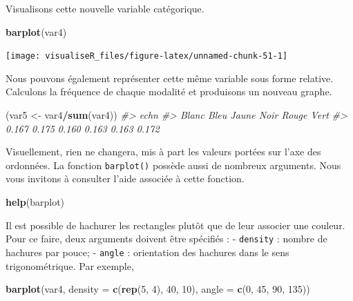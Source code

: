 \documentclass[]{article}
\newenvironment{Shaded}{\begin{snugshade}}{\end{snugshade}}
\newcommand{\CommentTok}[1]{\textcolor[rgb]{0.56,0.35,0.01}{\textit{#1}}}
\newcommand{\DataTypeTok}[1]{\textcolor[rgb]{0.13,0.29,0.53}{#1}}
\newcommand{\DecValTok}[1]{\textcolor[rgb]{0.00,0.00,0.81}{#1}}
\newcommand{\KeywordTok}[1]{\textcolor[rgb]{0.13,0.29,0.53}{\textbf{#1}}}
\newcommand{\NormalTok}[1]{#1}
\newcommand{\OperatorTok}[1]{\textcolor[rgb]{0.81,0.36,0.00}{\textbf{#1}}}
\newcommand{\StringTok}[1]{\textcolor[rgb]{0.31,0.60,0.02}{#1}}
\begin{document}
Visualisons cette nouvelle variable catégorique.

\begin{Shaded}
\begin{Highlighting}[]
\KeywordTok{barplot}\NormalTok{(var4)}
\end{Highlighting}
\end{Shaded}

\begin{center}\texttt{[image: visualiseR\_files/figure-latex/unnamed-chunk-51-1]} \end{center}

Nous pouvons également représenter cette même variable sous forme relative. Calculons la fréquence de chaque modalité et produisons un nouveau graphe.

\begin{Shaded}
\begin{Highlighting}[]
\NormalTok{(var5 <-}\StringTok{ }\NormalTok{var4}\OperatorTok{/}\KeywordTok{sum}\NormalTok{(var4))}
\CommentTok{#> echn}
\CommentTok{#> Blanc  Bleu Jaune  Noir Rouge  Vert }
\CommentTok{#> 0.167 0.175 0.160 0.163 0.163 0.172}
\end{Highlighting}
\end{Shaded}

Visuellement, rien ne changera, mis à part les valeurs portées sur l'axe des ordonnées. La fonction \texttt{barplot()} possède aussi de nombreux arguments. Nous vous invitons à consulter l'aide associée à cette fonction.

\begin{Shaded}
\begin{Highlighting}[]
\KeywordTok{help}\NormalTok{(barplot)}
\end{Highlighting}
\end{Shaded}

Il est possible de hachurer les rectangles plutôt que de leur associer une couleur. Pour ce faire, deux arguments doivent être spécifiés :
- \texttt{density} : nombre de hachures par pouce;
- \texttt{angle} : orientation des hachures dans le sens trigonométrique.
Par exemple,

\begin{Shaded}
\begin{Highlighting}[]
\KeywordTok{barplot}\NormalTok{(var4, }\DataTypeTok{density =} \KeywordTok{c}\NormalTok{(}\KeywordTok{rep}\NormalTok{(}\DecValTok{5}\NormalTok{, }\DecValTok{4}\NormalTok{), }\DecValTok{40}\NormalTok{, }\DecValTok{10}\NormalTok{), }\DataTypeTok{angle =} \KeywordTok{c}\NormalTok{(}\DecValTok{0}\NormalTok{, }\DecValTok{45}\NormalTok{, }\DecValTok{90}\NormalTok{, }\DecValTok{135}\NormalTok{))}
\end{Highlighting}
\end{Shaded}
\end{document}

